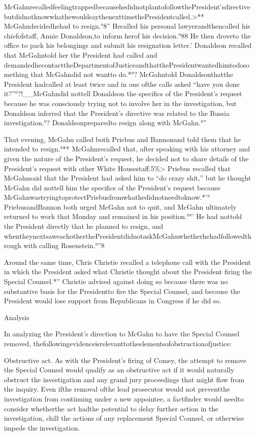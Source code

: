 {McGahnrecalledfeelingtrappedbecausehedidnotplantofollowthePresident’sdirective butdidnotknowwhathewouldsaythenexttimethePresidentcalled.>** McGahndecidedhehad to resign.°8” Hecalled his personal lawyerandthencalled his chiefofstaff, Annie Donaldson,to inform herof his decision.°88 He then droveto the office to pack his belongings and submit his resignation letter.’ Donaldson recalled that McGahntold her the President had called and demandedhecontacttheDepartmentofJusticeandthatthePresidentwantedhimtodosomething that McGahndid not wantto do.*°? McGahntold Donaldsonthatthe President hadcalled at least twice and in one ofthe calls asked “have you done it?”°?!__McGahndid nottell Donaldson the specifics of the President’s request because he was consciously trying not to involve her in the investigation, but Donaldson inferred that the President’s directive was related to the Russia investigation.°? Donaldsonpreparedto resign along with McGahn.°”

That evening, McGahn called both Priebus and Bannonand told them that he intended to resign.°** McGahnrecalled that, after speaking with his attorney and given the nature of the President’s request, he decided not to share details of the President’s request with other White Housestaff.5\%> Priebus recalled that McGahnsaid that the President had asked him to “do crazy shit,” but he thought McGahn did nottell him the specifics of the President’s request because McGahnwastryingtoprotectPriebusfromwhathedidnotneedtoknow.*’° PriebusandBannon both urged McGahn not to quit, and McGahn ultimately returned to work that Monday and remained in his position.°°’ He had nottold the President directly that he planned to resign, and whentheynextsaweachotherthePresidentdidnotaskMcGahnwhetherhehadfollowedthrough with calling Rosenstein.°”8

Around the same time, Chris Christie recalled a telephone call with the President in which the President asked what Christie thought about the President firing the Special Counsel.*” Christie advised against doing so because there was no substantive basis for the Presidentto fire the Special Counsel, and because the President would lose support from Republicans in Congress if he did so.%

Analysis

In analyzing the President’s direction to McGahn to have the Special Counsel removed, thefollowingevidenceisrelevanttotheelementsofobstructionofjustice:

Obstructive act. As with the President’s firing of Comey, the attempt to remove the Special Counsel would qualify as an obstructive act if it would naturally obstruct the investigation and any grand jury proceedings that might flow from the inquiry. Even ifthe removal ofthe lead prosecutor would not preventthe investigation from continuing under a new appointee, a factfinder would needto consider whetherthe act hadthe potential to delay further action in the investigation, chill the actions of any replacement Special Counsel, or otherwise impede the investigation.

}
